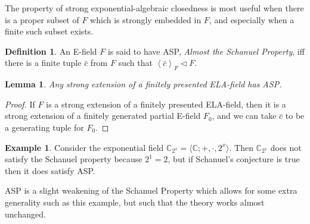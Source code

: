 \documentclass[12pt]{amsart}
\newtheorem{lemma}[prop]{Lemma}
\theoremstyle{definition}
\newtheorem{defn}[prop]{Definition}
\newtheorem{example}[prop]{Example}
\begin{document}
The property of strong exponential-algebraic closedness is most useful
when there is a proper subset of $F$ which is strongly embedded in
$F$, and especially when a finite such subset exists.
\begin{defn}
  An E-field $F$ is said to have ASP, \emph{Almost the Schanuel
    Property}, iff there is a finite tuple ${{\ensuremath{\bar{c}}}}$ from $F$ such that
    ${\ensuremath{\left\langle {{\ensuremath{\bar{c}}}} \right\rangle}}_F {\ensuremath{\lhd}} F$.
\end{defn}
\begin{lemma}
Any strong extension of a finitely presented ELA-field has ASP.
\end{lemma}
\begin{proof}
If $F$ is a strong extension of a finitely presented ELA-field, then it is a strong extension of a finitely generated partial E-field $F_0$, and we can take ${{\ensuremath{\bar{c}}}}$ to be a generating tuple for $F_0$.
\end{proof}

\begin{example}
  Consider the exponential field ${\ensuremath{\mathbb{C}}}_{2^x} = {\ensuremath{\langle {{\ensuremath{\mathbb{C}}};+,\cdot,2^x} \rangle}}$. Then ${\ensuremath{\mathbb{C}}}_{2^x}$ does not satisfy the Schanuel property because $2^1 = 2$, but if Schanuel's conjecture is true then it does satisfy ASP.
\end{example}
ASP is a slight weakening of the Schanuel Property which allows for some extra generality such as this example, but such that the theory works almost unchanged.
\end{document}
